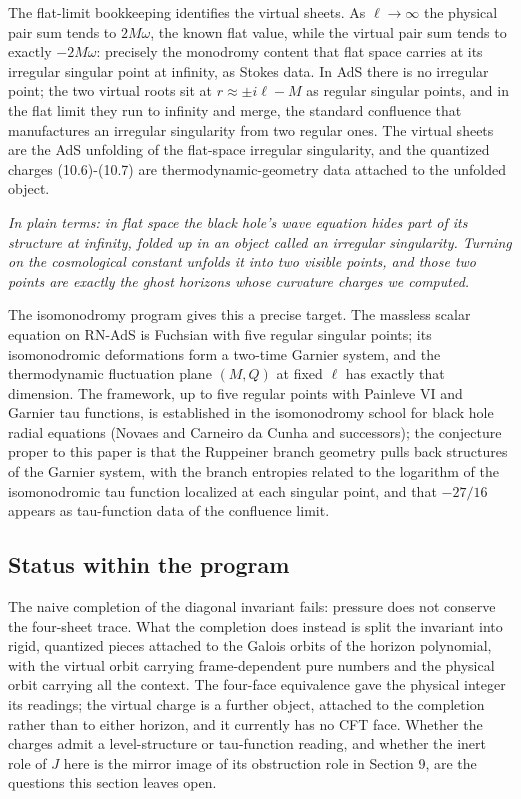 \documentclass[11pt]{article}
\begin{document}
The flat-limit bookkeeping identifies the virtual sheets. As $\ell \to \infty$ the physical pair sum tends to $2M\omega$, the known flat value, while the virtual pair sum tends to exactly $-2M\omega$: precisely the monodromy content that flat space carries at its irregular singular point at infinity, as Stokes data. In AdS there is no irregular point; the two virtual roots sit at $r \approx \pm i\ell - M$ as regular singular points, and in the flat limit they run to infinity and merge, the standard confluence that manufactures an irregular singularity from two regular ones. The virtual sheets are the AdS unfolding of the flat-space irregular singularity, and the quantized charges (10.6)-(10.7) are thermodynamic-geometry data attached to the unfolded object.

\emph{In plain terms: in flat space the black hole's wave equation hides part of its structure at infinity, folded up in an object called an irregular singularity. Turning on the cosmological constant unfolds it into two visible points, and those two points are exactly the ghost horizons whose curvature charges we computed.}

The isomonodromy program gives this a precise target. The massless scalar equation on RN-AdS is Fuchsian with five regular singular points; its isomonodromic deformations form a two-time Garnier system, and the thermodynamic fluctuation plane $(M,Q)$ at fixed $\ell$ has exactly that dimension. The framework, up to five regular points with Painleve VI and Garnier tau functions, is established in the isomonodromy school for black hole radial equations (Novaes and Carneiro da Cunha and successors); the conjecture proper to this paper is that the Ruppeiner branch geometry pulls back structures of the Garnier system, with the branch entropies related to the logarithm of the isomonodromic tau function localized at each singular point, and that $-27/16$ appears as tau-function data of the confluence limit.

\subsection{Status within the program}

The naive completion of the diagonal invariant fails: pressure does not conserve the four-sheet trace. What the completion does instead is split the invariant into rigid, quantized pieces attached to the Galois orbits of the horizon polynomial, with the virtual orbit carrying frame-dependent pure numbers and the physical orbit carrying all the context. The four-face equivalence gave the physical integer its readings; the virtual charge is a further object, attached to the completion rather than to either horizon, and it currently has no CFT face. Whether the charges admit a level-structure or tau-function reading, and whether the inert role of $J$ here is the mirror image of its obstruction role in Section 9, are the questions this section leaves open.
\end{document}
